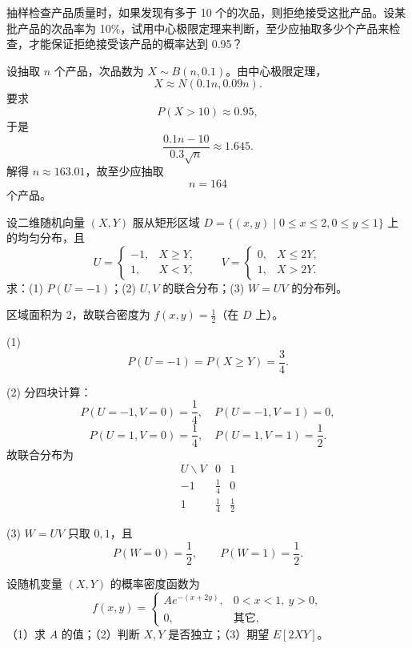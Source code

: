 \documentclass[lang=cn,11pt]{elegantbook}
\begin{document}
\begin{exercise}
\par
抽样检查产品质量时，如果发现有多于 10 个的次品，则拒绝接受这批产品。设某批产品的次品率为 10\%，试用中心极限定理来判断，至少应抽取多少个产品来检查，才能保证拒绝接受该产品的概率达到 0.95？
\end{exercise}

\begin{solution}
\par
设抽取 \(n\) 个产品，次品数为 \(X\sim B(n,0.1)\)。由中心极限定理，
\[
X\approx N(0.1n,0.09n).
\]
要求
\[
P(X>10)\approx 0.95,
\]
于是
\[
\frac{0.1n-10}{0.3\sqrt n}\approx1.645.
\]
解得 \(n\approx163.01\)，故至少应抽取
\[
n=164
\]
个产品。
\end{solution}

\begin{exercise}
\par
设二维随机向量 \((X,Y)\) 服从矩形区域 \(D=\{(x,y)\mid 0\le x\le2,0\le y\le1\}\) 上的均匀分布，且
\[
U=\begin{cases}
-1, & X\ge Y,\\
1, & X<Y,
\end{cases}
\qquad
V=\begin{cases}
0, & X\le2Y,\\
1, & X>2Y.
\end{cases}
\]
求：(1) \(P(U=-1)\)；(2) \(U,V\) 的联合分布；(3) \(W=UV\) 的分布列。
\end{exercise}

\begin{solution}
\par
区域面积为 2，故联合密度为 \(f(x,y)=\frac12\)（在 \(D\) 上）。

(1)
\[
P(U=-1)=P(X\ge Y)=\frac34.
\]

(2) 分四块计算：
\[
P(U=-1,V=0)=\frac14,\quad
P(U=-1,V=1)=0,
\]
\[
P(U=1,V=0)=\frac14,\quad
P(U=1,V=1)=\frac12.
\]
故联合分布为
\[
\begin{array}{c|cc}
U\backslash V & 0 & 1\\ \hline
-1 & \frac14 & 0\\
1 & \frac14 & \frac12
\end{array}
\]

(3) \(W=UV\) 只取 \(0,1\)，且
\[
P(W=0)=\frac12,\qquad P(W=1)=\frac12.
\]
\end{solution}

\begin{exercise}
\par
设随机变量 \((X,Y)\) 的概率密度函数为
\[
f(x,y)=
\begin{cases}
Ae^{-(x+2y)}, & 0<x<1,\ y>0,\\
0, & \text{其它},
\end{cases}
\]
（1）求 \(A\) 的值；（2）判断 \(X,Y\) 是否独立；（3）期望 \(E[2XY]\)。
\end{exercise}
\end{document}
